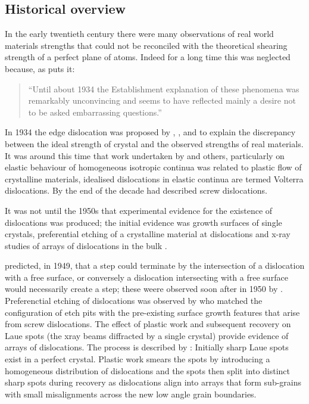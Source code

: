\FloatBarrier

\subsection{Historical overview}


In the early twentieth century there were many observations of real world materials strengths that could not be reconciled with the theoretical shearing strength of a perfect plane of atoms. Indeed for a long time this was neglected because, as \citet{gordon1991} puts it:
\begin{quote}
``Until about 1934 the Establishment explanation of these phenomena was remarkably unconvincing and seems to have reflected mainly a desire not to be asked embarrassing questions.''
\end{quote}

In 1934 the edge dislocation was proposed by \cite{orowan1934i,Orowan1934ii,Orowan1934iii}, \citet{Taylor1934}, and \citet{polanyi1934} to explain the discrepancy between the ideal strength of crystal and the observed strengths of real materials. It was around this time that work undertaken by \citet{Volterra1907} and others, particularly \citet{love1920}
on elastic behaviour of homogeneous isotropic continua was related to plastic flow of crystalline materials, idealised dislocations in elastic continua are termed Volterra dislocations. By the end of the decade \citet{burgers1939} had described screw dislocations. 

It was not until the 1950s that experimental evidence for the existence of dislocations was produced; the initial evidence was growth surfaces of single crystals, preferential etching of a crystalline material at dislocations and x-ray studies of arrays of dislocations in the bulk \cite{Forty1954}. 

\citet{Frank1949} predicted, in 1949, that a step could terminate by the intersection of a dislocation with a free surface, or conversely a dislocation intersecting with a free surface would necessarily create a step; these weere observed soon after in 1950 by \citet{Griffin1950}. Preferenctial etching of dislocations was observed by \citet{horn1952holes} who matched the configuration of etch pits with the pre-existing surface growth features that arise from screw dislocations. The effect of plastic work and subsequent recovery on Laue spots (the xray beams diffracted by a single crystal) provide evidence of arrays of dislocations. The process is described by \citet{Cottrell1949}: Initially sharp Laue spots exist in a perfect crystal. Plastic work smears the spots by introducing a homogeneous distribution of dislocations and the spots then split into distinct sharp spots during recovery as dislocations align into arrays that form sub-grains with small misalignments across the new low angle grain boundaries.


